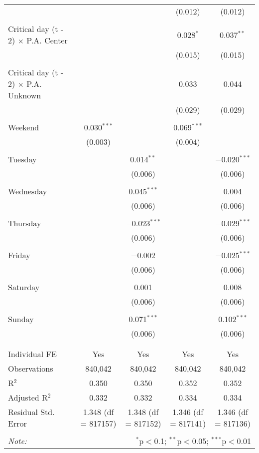 \documentclass[
]{article}
\begin{document}
\begin{table}[!htbp]
{\begin{tabular}{@{\extracolsep{5pt}}lcccc}
  &  &  & (0.012) & (0.012) \\ 
  & & & & \\ 
 Critical day (t - 2) $\times$ P.A. Center &  &  & 0.028$^{*}$ & 0.037$^{**}$ \\ 
  &  &  & (0.015) & (0.015) \\ 
  & & & & \\ 
 Critical day (t - 2) $\times$ P.A. Unknown &  &  & 0.033 & 0.044 \\ 
  &  &  & (0.029) & (0.029) \\ 
  & & & & \\ 
 Weekend & 0.030$^{***}$ &  & 0.069$^{***}$ &  \\ 
  & (0.003) &  & (0.004) &  \\ 
  & & & & \\ 
 Tuesday &  & 0.014$^{**}$ &  & $-$0.020$^{***}$ \\ 
  &  & (0.006) &  & (0.006) \\ 
  & & & & \\ 
 Wednesday &  & 0.045$^{***}$ &  & 0.004 \\ 
  &  & (0.006) &  & (0.006) \\ 
  & & & & \\ 
 Thursday &  & $-$0.023$^{***}$ &  & $-$0.029$^{***}$ \\ 
  &  & (0.006) &  & (0.006) \\ 
  & & & & \\ 
 Friday &  & $-$0.002 &  & $-$0.025$^{***}$ \\ 
  &  & (0.006) &  & (0.006) \\ 
  & & & & \\ 
 Saturday &  & 0.001 &  & 0.008 \\ 
  &  & (0.006) &  & (0.006) \\ 
  & & & & \\ 
 Sunday &  & 0.071$^{***}$ &  & 0.102$^{***}$ \\ 
  &  & (0.006) &  & (0.006) \\ 
  & & & & \\ 
\hline \\[-1.8ex] 
Individual FE & Yes & Yes & Yes & Yes \\ 
Observations & 840,042 & 840,042 & 840,042 & 840,042 \\ 
R$^{2}$ & 0.350 & 0.350 & 0.352 & 0.352 \\ 
Adjusted R$^{2}$ & 0.332 & 0.332 & 0.334 & 0.334 \\ 
Residual Std. Error & 1.348 (df = 817157) & 1.348 (df = 817152) & 1.346 (df = 817141) & 1.346 (df = 817136) \\ 
\hline 
\hline \\[-1.8ex] 
\textit{Note:}  & \multicolumn{4}{r}{$^{*}$p$<$0.1; $^{**}$p$<$0.05; $^{***}$p$<$0.01} \\ 
\end{tabular}
} 
\end{table} 
\newpage
\end{document}
